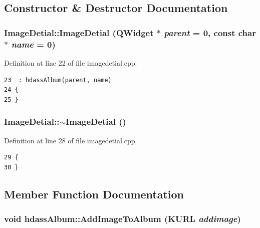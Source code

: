 \subsection{Constructor \& Destructor Documentation}
\subsubsection{\setlength{\rightskip}{0pt plus 5cm}Image\-Detial::Image\-Detial ({\bf QWidget} $\ast$ {\em parent} = 0, const char $\ast$ {\em name} = 0)}\label{classImageDetial_ImageDetiala0}




Definition at line 22 of file imagedetial.cpp.



\footnotesize\begin{verbatim}23  : hdassAlbum(parent, name)
24 {
25 }
\end{verbatim}\normalsize 
{}
\subsubsection{\setlength{\rightskip}{0pt plus 5cm}Image\-Detial::$\sim${\bf Image\-Detial} ()}\label{classImageDetial_ImageDetiala1}




Definition at line 28 of file imagedetial.cpp.



\footnotesize\begin{verbatim}29 {
30 }
\end{verbatim}\normalsize 


\subsection{Member Function Documentation}
\subsubsection{\setlength{\rightskip}{0pt plus 5cm}void hdass\-Album::Add\-Image\-To\-Album (KURL {\em addimage})\hspace{0.3cm}{\tt  [slot, inherited]}}\label{classhdassAlbum_ImageDetiali1}




